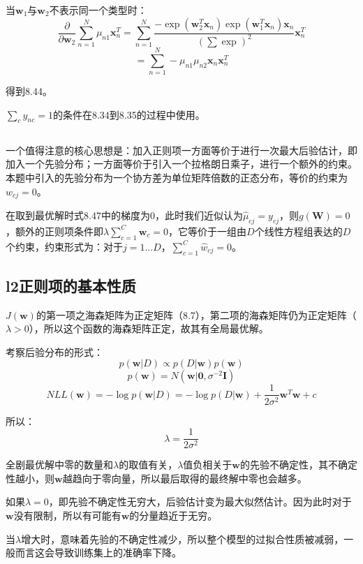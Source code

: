 \documentclass[UTF8]{ctexart}
\begin{document}
当$\textbf{w}_{1}$与$\textbf{w}_{2}$不表示同一个类型时：
$$\frac{\partial}{\partial \textbf{w}_{2}} \sum_{n=1}^{N}\mu_{n1}\textbf{x}_{n}^{T}=\sum_{n=1}^{N}\frac{-\exp(\textbf{w}_{2}^{T}\textbf{x}_{n})\exp(\textbf{w}_{1}^{T}\textbf{x}_{n})\textbf{x}_{n}}{(\sum\exp)^{2}}\textbf{x}_{n}^{T}$$
$$=\sum_{n=1}^{N}-\mu_{n1}\mu_{n2}\textbf{x}_{n}\textbf{x}_{n}^{T}$$

得到8.44。

$\sum_{c}y_{nc}=1$的条件在8.34到8.35的过程中使用。

\subsection{}
一个值得注意的核心思想是：加入正则项一方面等价于进行一次最大后验估计，即加入一个先验分布；一方面等价于引入一个拉格朗日乘子，进行一个额外的约束。本题中引入的先验分布为一个协方差为单位矩阵倍数的正态分布，等价的约束为$w_{cj}=0$。

在取到最优解时式8.47中的梯度为0，此时我们近似认为$\hat{\mu}_{cj}=y_{cj}$，则$g(\textbf{W})=0$，额外的正则项条件即$\lambda\sum_{c=1}^{C}\textbf{w}_{c}=0$，它等价于一组由$D$个线性方程组表达的$D$个约束，约束形式为：对于$j=1...D$，$\sum_{c=1}^{C}\hat{w}_{cj}=0$。

\subsection{l2正则项的基本性质}
$J(\textbf{w})$的第一项之海森矩阵为正定矩阵（8.7），第二项的海森矩阵仍为正定矩阵（$\lambda > 0$），所以这个函数的海森矩阵正定，故其有全局最优解。

考察后验分布的形式：
$$p(\textbf{w}|D)\propto p(D|\textbf{w})p(\textbf{w})$$
$$p(\textbf{w})=N(\textbf{w}|\textbf{0},\sigma^{-2}\textbf{I})$$
$$NLL(\textbf{w})=-\log p(\textbf{w}|D) = -\log p(D|\textbf{w}) + \frac{1}{2\sigma^{2}}\textbf{w}^{T}\textbf{w}+c$$

所以：
$$\lambda=\frac{1}{2\sigma^{2}}$$


全剧最优解中零的数量和$\lambda$的取值有关，$\lambda$值负相关于$\textbf{w}$的先验不确定性，其不确定性越小，则$\textbf{w}$越趋向于零向量，所以最后取得的最终解中零也会越多。

如果$\lambda=0$，即先验不确定性无穷大，后验估计变为最大似然估计。因为此时对于$\textbf{w}$没有限制，所以有可能有$\textbf{w}$的分量趋近于无穷。

当$\lambda$增大时，意味着先验的不确定性减少，所以整个模型的过拟合性质被减弱，一般而言这会导致训练集上的准确率下降。
\end{document}
